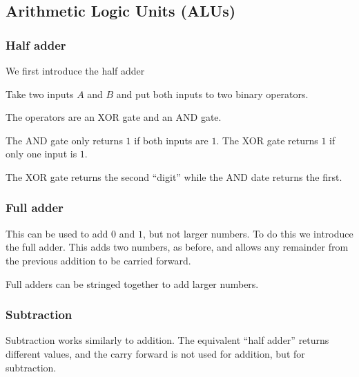 
\subsection{Arithmetic Logic Units (ALUs)}

\subsubsection{Half adder}

We first introduce the half adder

Take two inputs \(A\) and \(B\) and put both inputs to two binary operators.

The operators are an XOR gate and an AND gate.

The AND gate only returns \(1\) if both inputs are \(1\). The XOR gate returns \(1\) if only one input is \(1\).

The XOR gate returns the second “digit” while the AND date returns the first.

\subsubsection{Full adder}

This can be used to add \(0\) and \(1\), but not larger numbers. To do this we introduce the full adder. This adds two numbers, as before, and allows any remainder from the previous addition to be carried forward.

Full adders can be stringed together to add larger numbers.	

\subsubsection{Subtraction}

Subtraction works similarly to addition. The equivalent “half adder” returns different values, and the carry forward is not used for addition, but for subtraction.

